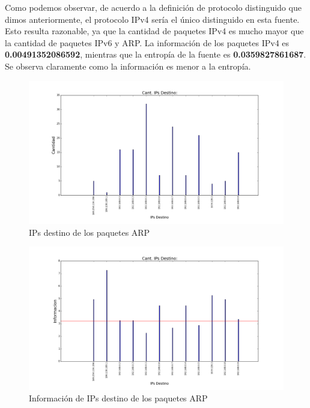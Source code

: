Como podemos observar, de acuerdo a la definición de protocolo distinguido que dimos anteriormente, el protocolo IPv4 sería el único distinguido en esta fuente. Esto resulta razonable, ya que la cantidad de paquetes IPv4 es mucho mayor que la cantidad de paquetes IPv6 y ARP. La información de los paquetes IPv4 es \textbf{0.00491352086592}, mientras que la entropía de la fuente es \textbf{0.0359827861687}. Se observa claramente como la información es menor a la entropía.


\begin{figure}[H]
       \centering
       \includegraphics[width=1\textwidth]{../resultados/Casa/histogram_dst.png}
       \caption{IPs destino de los paquetes ARP}
       \label{red-hogarena-arp-destination}
\end{figure}

\begin{figure}[H]
       \centering
       \includegraphics[width=1\textwidth]{../resultados/Casa/histogram_dst_information.png}
       \caption{Información de IPs destino de los paquetes ARP}
       \label{red-hogarena-arp-destination-info}
\end{figure}



